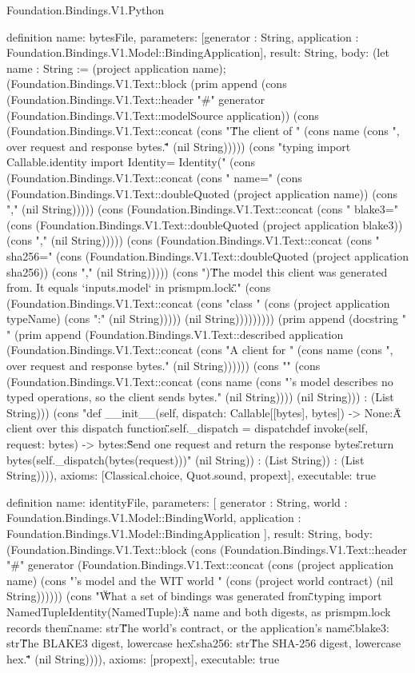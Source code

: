 \begin{lexlean}{Foundation.Bindings.V1.Python}
\begin{semanticmodule}
definition{
  name: bytesFile,
  parameters: [generator : String, application : Foundation.Bindings.V1.Model::BindingApplication],
  result: String,
  body: (let name : String := (project application name); (Foundation.Bindings.V1.Text::block (prim append (cons (Foundation.Bindings.V1.Text::header "#" generator (Foundation.Bindings.V1.Text::modelSource application)) (cons (Foundation.Bindings.V1.Text::concat (cons "\"\"\"The client of " (cons name (cons ", over request and response bytes.\"\"\"" (nil String))))) (cons "\nfrom typing import Callable\n\nfrom .identity import Identity\n\nMODEL = Identity(" (cons (Foundation.Bindings.V1.Text::concat (cons "    name=" (cons (Foundation.Bindings.V1.Text::doubleQuoted (project application name)) (cons "," (nil String))))) (cons (Foundation.Bindings.V1.Text::concat (cons "    blake3=" (cons (Foundation.Bindings.V1.Text::doubleQuoted (project application blake3)) (cons "," (nil String))))) (cons (Foundation.Bindings.V1.Text::concat (cons "    sha256=" (cons (Foundation.Bindings.V1.Text::doubleQuoted (project application sha256)) (cons "," (nil String))))) (cons ")\n\"\"\"The model this client was generated from. It equals `inputs.model` in prismpm.lock.\"\"\"\n\n" (cons (Foundation.Bindings.V1.Text::concat (cons "class " (cons (project application typeName) (cons ":" (nil String))))) (nil String))))))))) (prim append (docstring "    " (prim append (Foundation.Bindings.V1.Text::described application (Foundation.Bindings.V1.Text::concat (cons "A client for " (cons name (cons ", over request and response bytes." (nil String)))))) (cons "" (cons (Foundation.Bindings.V1.Text::concat (cons name (cons "'s model describes no typed operations, so the client sends bytes." (nil String)))) (nil String))) : (List String))) (cons "\n    def __init__(self, dispatch: Callable[[bytes], bytes]) -> None:\n        \"\"\"A client over this dispatch function.\"\"\"\n        self._dispatch = dispatch\n\n    def invoke(self, request: bytes) -> bytes:\n        \"\"\"Send one request and return the response bytes.\"\"\"\n        return bytes(self._dispatch(bytes(request)))" (nil String)) : (List String)) : (List String)))),
  axioms: [Classical.choice, Quot.sound, propext],
  executable: true
}

definition{
  name: identityFile,
  parameters: [
    generator : String,
    world : Foundation.Bindings.V1.Model::BindingWorld,
    application : Foundation.Bindings.V1.Model::BindingApplication
  ],
  result: String,
  body: (Foundation.Bindings.V1.Text::block (cons (Foundation.Bindings.V1.Text::header "#" generator (Foundation.Bindings.V1.Text::concat (cons (project application name) (cons "'s model and the WIT world " (cons (project world contract) (nil String)))))) (cons "\"\"\"What a set of bindings was generated from.\"\"\"\n\nfrom typing import NamedTuple\n\n\nclass Identity(NamedTuple):\n    \"\"\"A name and both digests, as prismpm.lock records them.\"\"\"\n\n    name: str\n    \"\"\"The world's contract, or the application's name.\"\"\"\n    blake3: str\n    \"\"\"The BLAKE3 digest, lowercase hex.\"\"\"\n    sha256: str\n    \"\"\"The SHA-256 digest, lowercase hex.\"\"\"" (nil String)))),
  axioms: [propext],
  executable: true
}


\end{semanticmodule}
\end{lexlean}
